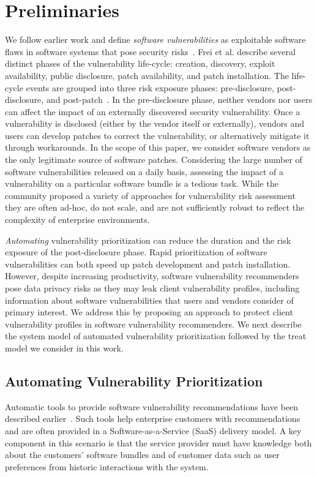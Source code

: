 {\section{Preliminaries}
\label{sec:vulnerability-management}
We follow earlier work and define \textit{software vulnerabilities} as exploitable software flaws in software systems that pose security risks~\cite{bozorgi:2009, frei:2010}.
Frei et al. describe several distinct phases of the vulnerability life-cycle: creation, discovery, exploit availability, public disclosure, patch availability, and patch installation.
The life-cycle events are grouped into three risk exposure phases: pre-disclosure, post-disclosure, and post-patch~\cite{frei:2010}.
In the pre-disclosure phase, neither vendors nor users can affect the impact of an externally discovered security vulnerability.
Once a vulnerability is disclosed (either by the vendor itself or externally), vendors and users can develop patches to correct the vulnerability, or alternatively mitigate it through workarounds.
In the scope of this paper, we consider software vendors as the only legitimate source of software patches.
Considering the large number of software vulnerabilities released on a daily basis, assessing the impact of a vulnerability on a particular software bundle is a tedious task.
While the community proposed a variety of approaches for vulnerability risk assessment~\cite{sridharan:2008} they are often ad-hoc, do not scale, and are not sufficiently robust to reflect the complexity of enterprise environments.

\textit{Automating} vulnerability prioritization can reduce the duration and the risk exposure of the post-disclosure phase.
Rapid prioritization of software vulnerabilities can both speed up patch development and patch installation.
However, despite increasing productivity, software vulnerability recommenders pose data privacy risks as they may leak client vulnerability  profiles, including information about software vulnerabilities that users and vendors consider of primary interest.
We address this by proposing an approach to protect client vulnerability profiles in software vulnerability recommenders. 
We next describe the system model of automated vulnerability prioritization followed by the treat model we consider in this work.

\subsection{Automating Vulnerability Prioritization}
\label{subsec:scenario}
Automatic tools to provide software vulnerability recommendations have been described earlier~\cite{farris:2018,cobleigh:2018}.
Such tools help enterprise customers with recommendations and are often provided in a Software-as-a-Service (SaaS) delivery model.
A key component in this scenario is that the service provider must have knowledge both about the customers' software bundles and of customer data such as user preferences from historic interactions with the system.

}
